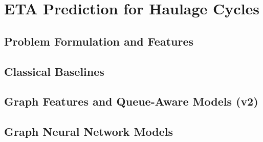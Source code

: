 \section{ETA Prediction for Haulage Cycles}

\subsection{Problem Formulation and Features}

\subsection{Classical Baselines}

\subsection{Graph Features and Queue-Aware Models (v2)}

\subsection{Graph Neural Network Models}

